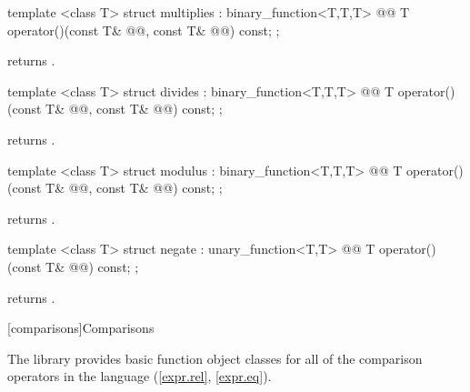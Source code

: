 \documentclass[american,twoside]{book}
\begin{document}
%
\begin{itemdecl}
template <class T> struct multiplies : binary_function<T,T,T> {
  @@
    T operator()(const T& @@, const T& @@) const;
};
\end{itemdecl}

\begin{itemdescr}
\pnum
{}
returns
.
\end{itemdescr}

%
\begin{itemdecl}
template <class T> struct divides : binary_function<T,T,T> {
  @@
  T operator()(const T& @@, const T& @@) const;
};
\end{itemdecl}

\begin{itemdescr}
\pnum
{}
returns
.
\end{itemdescr}

%
\begin{itemdecl}
template <class T> struct modulus : binary_function<T,T,T> {
  @@
    T operator()(const T& @@, const T& @@) const;
};
\end{itemdecl}

\begin{itemdescr}
\pnum
{} returns .
\end{itemdescr}

%
\begin{itemdecl}
template <class T> struct negate : unary_function<T,T> {
  @@
    T operator()(const T& @@) const;
};
\end{itemdecl}

\begin{itemdescr}
\pnum
{} returns .
\end{itemdescr}

[comparisons]{Comparisons}

\pnum
The library provides basic function object classes for all of the comparison
operators in the language (\ref{expr.rel}, \ref{expr.eq}).
\end{document}
